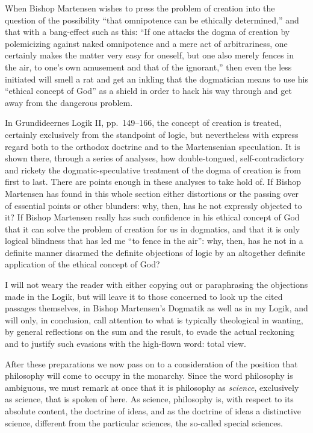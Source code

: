 \documentclass[12pt]{book}
\newcommand{\opage}[1]{\marginnote{\footnotesize\textit{[#1]}}}
\begin{document}
When Bishop Martensen wishes to press the problem of creation into the question of the possibility ``that omnipotence can be ethically determined,'' and that with a bang-effect such as this: ``If one attacks the dogma of creation by polemicizing against naked omnipotence and a mere act of arbitrariness, one certainly makes the matter very easy for oneself, but one also merely fences in the air, to one's own amusement and that of the ignorant,'' then even the less initiated will smell a rat and get an inkling that the dogmatician means to use his ``ethical concept of God'' as a shield in order to hack his way through and get away from the dangerous problem.

In Grundideernes Logik II, pp.~149--166, the concept of creation is treated, certainly exclusively from the standpoint of logic, but nevertheless with express regard both to the orthodox doctrine and to the Martensenian speculation. It is shown there, through a series of analyses, how double-tongued, self-contradictory and rickety the dogmatic-speculative treatment of the dogma of creation is from first to last. There are points enough in these analyses to take hold of. If Bishop Martensen has found in this whole section either distortions or the passing over of essential points or other blunders: why, then, has he not expressly objected to it? If Bishop Martensen really has such confidence in his ethical concept of God that it can solve the problem of creation for us in dogmatics, and that it is only logical blindness that has led me ``to fence in the air'': why, then, has he not in a definite manner disarmed the definite objections of logic by an altogether definite application of the ethical concept of God?

\opage{104}\setcounter{footnote}{0}%
I will not weary the reader with either copying out or paraphrasing the objections made in the Logik, but will leave it to those concerned to look up the cited passages themselves, in Bishop Martensen's Dogmatik as well as in my Logik, and will only, in conclusion, call attention to what is typically theological in wanting, by general reflections on the sum and the result, to evade the actual reckoning and to justify such evasions with the high-flown word: total view.

After these preparations we now pass on to a consideration of the position that philosophy will come to occupy in the monarchy. Since the word philosophy is ambiguous, we must remark at once that it is philosophy as \emph{science}, exclusively as science, that is spoken of here. As science, philosophy is, with respect to its absolute content, the doctrine of ideas, and as the doctrine of ideas a distinctive science, different from the particular sciences, the so-called special sciences.
\end{document}
